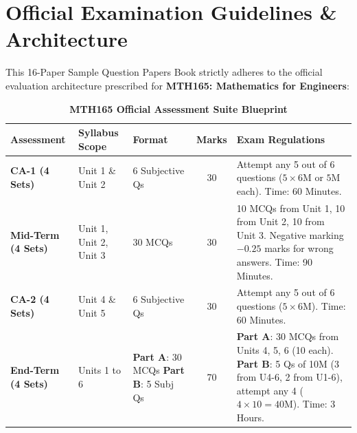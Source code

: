 \chapter*{Official Examination Guidelines \& Architecture}

This 16-Paper Sample Question Papers Book strictly adheres to the official evaluation architecture prescribed for \textbf{MTH165: Mathematics for Engineers}:

\begin{table}[htbp]
\centering
\caption{\textbf{MTH165 Official Assessment Suite Blueprint}}
\vspace{2mm}
\begin{tabularx}{\textwidth}{l p{3.2cm} p{2.8cm} c X}
\toprule
\textbf{Assessment} & \textbf{Syllabus Scope} & \textbf{Format} & \textbf{Marks} & \textbf{Exam Regulations} \\
\midrule
\textbf{CA-1 (4 Sets)} & Unit 1 \& Unit 2 & 6 Subjective Qs & 30 & Attempt any 5 out of 6 questions ($5 \times 6\text{M}$ or $5\text{M}$ each). Time: 60 Minutes. \\
\addlinespace
\textbf{Mid-Term (4 Sets)} & Unit 1, Unit 2, Unit 3 & 30 MCQs & 30 & 10 MCQs from Unit 1, 10 from Unit 2, 10 from Unit 3. Negative marking $-0.25$ marks for wrong answers. Time: 90 Minutes. \\
\addlinespace
\textbf{CA-2 (4 Sets)} & Unit 4 \& Unit 5 & 6 Subjective Qs & 30 & Attempt any 5 out of 6 questions ($5 \times 6\text{M}$). Time: 60 Minutes. \\
\addlinespace
\textbf{End-Term (4 Sets)} & Units 1 to 6 & \textbf{Part A}: 30 MCQs \newline \textbf{Part B}: 5 Subj Qs & 70 & \textbf{Part A}: 30 MCQs from Units 4, 5, 6 (10 each). \newline \textbf{Part B}: 5 Qs of 10M (3 from U4-6, 2 from U1-6), attempt any 4 ($4 \times 10 = 40\text{M}$). Time: 3 Hours. \\
\bottomrule
\end{tabularx}
\end{table}

\newpage
